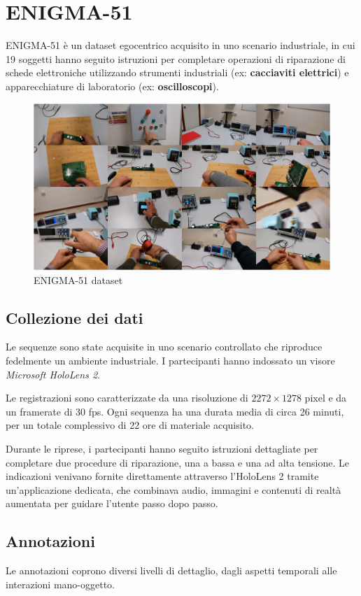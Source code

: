 \section{ENIGMA-51}
ENIGMA-51 è un dataset egocentrico acquisito in uno scenario industriale, in cui 19 soggetti hanno seguito istruzioni per completare operazioni di riparazione di schede elettroniche utilizzando strumenti industriali (ex: \textbf{cacciaviti elettrici}) e apparecchiature di laboratorio (ex: \textbf{oscilloscopi}).  

\begin{figure}[ht]
    \centering
    \includegraphics[width=0.8\linewidth]{Images/enigma_ex.png}
    \caption{ENIGMA-51 dataset}
\end{figure}

\subsection*{Collezione dei dati}
Le sequenze sono state acquisite in uno scenario controllato che riproduce fedelmente un ambiente industriale. I partecipanti hanno indossato un visore \emph{Microsoft HoloLens 2}.

Le registrazioni sono caratterizzate da una risoluzione di $2272 \times 1278$ pixel e da un framerate di 30 fps. Ogni sequenza ha una durata media di circa 26 minuti, per un totale complessivo di 22 ore di materiale acquisito.  

Durante le riprese, i partecipanti hanno seguito istruzioni dettagliate per completare due procedure di riparazione, una a bassa e una ad alta tensione. Le indicazioni venivano fornite direttamente attraverso l'HoloLens 2 tramite un'applicazione dedicata, che combinava audio, immagini e contenuti di realtà aumentata per guidare l'utente passo dopo passo.

\subsection*{Annotazioni}
Le annotazioni coprono diversi livelli di dettaglio, dagli aspetti temporali alle interazioni mano-oggetto.

